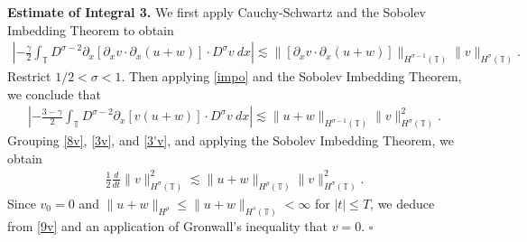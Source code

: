 \documentclass[12pt,reqno]{amsart}
\renewcommand{\qedsymbol}{\ensuremath{\square}}
\newcommand{\p}{\partial}
\newcommand{\ci}{\mathbb{T}}
\theoremstyle{plain}  %
\theoremstyle{definition}
\begin{document}
{\bf Estimate of Integral 3.} We first apply
Cauchy-Schwartz and the Sobolev Imbedding Theorem to obtain
%
%
\begin{equation*}
\begin{split}
\left | - \frac{\gamma}{2} \int_{\ci} D^{\sigma 
-2} \p_x [ \p_x v
\cdot \p_x (u+w)]\cdot D^\sigma v \ dx \right | 
 \lesssim 
\|[\p_x v \cdot \p_x (u+w)] \|_{H^{\sigma -1}(\ci)}
\|v\|_{H^\sigma(\ci)}.
\end{split}
\end{equation*}
%
%
Restrict $1/2 < \sigma < 1$. Then applying \autoref{impo} and the Sobolev 
Imbedding Theorem, we conclude that
%
%
\begin{equation}
\begin{split}
\left | - \frac{3-\gamma}{2} \int_{\ci}  D^{\sigma -2}
\p_x[v(u+w)] \cdot
D^\sigma v \ dx  \right |
 \lesssim \|u+w \|_{H^{\sigma - 1}(\ci)}
\|v\|_{H^\sigma(\ci)}^2.
\label{3'v}
\end{split}
\end{equation}
%
%
%
%
Grouping \eqref{8v}, \eqref{3v}, and \eqref{3'v}, and 
applying
the Sobolev Imbedding Theorem, we obtain
%
%
\begin{equation}
\begin{split}
\frac{1}{2} \frac{d}{dt}
\|v\|_{H^\sigma(\ci)}^2 \lesssim \|u+w\|_{H^\rho(\ci)}
\|v\|_{H^\sigma(\ci)}^2.
\label{9v}
\end{split}
\end{equation}
%
%
%
%
%
%
Since $v_0 = 0$ and $\|u + w \|_{H^\rho}
\le \|u + w \|_{H^s(\ci)} < \infty$ for $|t| \le T$, we deduce from 
\eqref{9v} and an application of  Gronwall's 
inequality that $v = 0$. \qquad \qedsymbol
%
%
%
\end{document}
